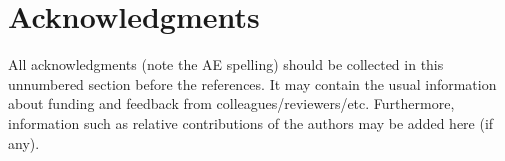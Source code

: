\documentclass[article]{jss}
\begin{document}





\section*{Acknowledgments}

\begin{leftbar}
All acknowledgments (note the AE spelling) should be collected in this
unnumbered section before the references. It may contain the usual information
about funding and feedback from colleagues/reviewers/etc. Furthermore,
information such as relative contributions of the authors may be added here
(if any).
\end{leftbar}







\end{document}

